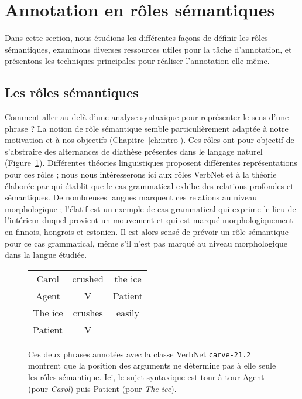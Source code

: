 
\section{Annotation en rôles sémantiques}
\label{sec:srl}

Dans cette section, nous étudions les différentes façons de définir les rôles
sémantiques, examinons diverses ressources utiles pour la tâche d'annotation,
et présentons les techniques principales pour réaliser l'annotation elle-même.

\subsection{Les rôles sémantiques}
\label{subsec:roles_semantiques}

Comment aller au-delà d'une analyse syntaxique pour représenter le sens d'une
phrase ? La notion de rôle sémantique semble particulièrement adaptée à notre
motivation et à nos objectifs (Chapitre~\ref{ch:intro}). Ces rôles ont pour
objectif de s'abstraire des alternances de diathèse présentes dans le langage
naturel (Figure~\ref{fig:exemple_srl}). Différentes théories linguistiques
proposent différentes représentations pour ces rôles ; nous nous intéresserons
ici aux rôles VerbNet et à la théorie élaborée par \cite{fillmore1968case} qui
établit que le cas grammatical exhibe des relations profondes et sémantiques.
De nombreuses langues marquent ces relations au niveau morphologique ; l'élatif
est un exemple de cas grammatical qui exprime le lieu de l'intérieur duquel
provient un mouvement et qui est marqué morphologiquement en finnois, hongrois
et estonien. Il est alors sensé de prévoir un rôle sémantique pour ce cas
grammatical, même s'il n'est pas marqué au niveau morphologique dans la langue
étudiée.


\begin{figure}[ht]
    \centering
    \begin{tabular}{ccc}
        \toprule
        Carol & crushed   & the ice \\
        Agent & V         & Patient \\
        \midrule
        The ice & crushes & easily  \\
        Patient & V       &         \\
        \bottomrule
    \end{tabular}

    \caption{\label{fig:exemple_srl}Ces deux phrases annotées avec la classe
    VerbNet \texttt{carve-21.2} montrent que la position des arguments ne
détermine pas à elle seule les rôles sémantique. Ici, le sujet syntaxique est
tour à tour Agent (pour \textit{Carol}) puis Patient (pour \textit{The ice}).}

\end{figure}

